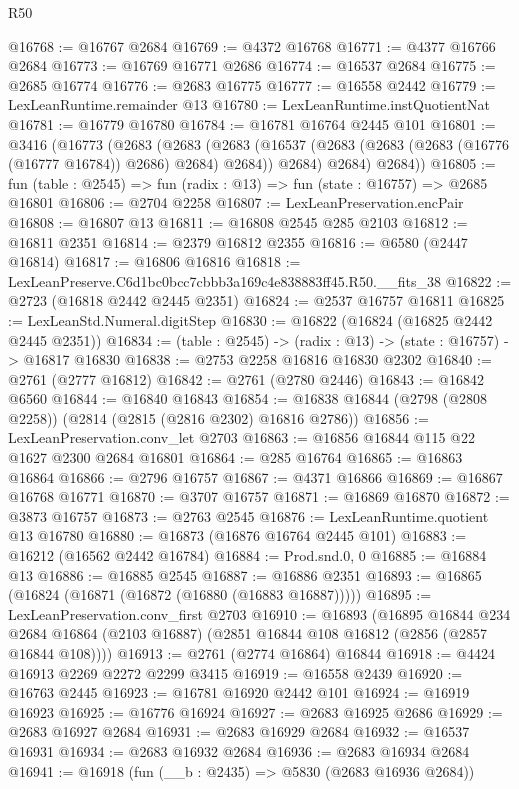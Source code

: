 \begin{lexlean}{R50}
\begin{coremodule}
@16768 := @16767 @2684
@16769 := @4372 @16768
@16771 := @4377 @16766 @2684
@16773 := @16769 @16771 @2686
@16774 := @16537 @2684
@16775 := @2685 @16774
@16776 := @2683 @16775
@16777 := @16558 @2442
@16779 := LexLeanRuntime.remainder @13
@16780 := LexLeanRuntime.instQuotientNat
@16781 := @16779 @16780
@16784 := @16781 @16764 @2445 @101
@16801 := @3416
    (@16773
      (@2683
        (@2683
          (@2683 (@16537 (@2683 (@2683 (@2683 (@16776 (@16777 @16784)) @2686) @2684) @2684)) @2684)
          @2684)
        @2684))
@16805 := fun (table : @2545) => fun (radix : @13) => fun (state : @16757) => @2685 @16801
@16806 := @2704 @2258
@16807 := LexLeanPreservation.encPair
@16808 := @16807 @13
@16811 := @16808 @2545 @285 @2103
@16812 := @16811 @2351
@16814 := @2379 @16812 @2355
@16816 := @6580 (@2447 @16814)
@16817 := @16806 @16816
@16818 := LexLeanPreserve.C6d1bc0bcc7cbbb3a169c4e838883ff45.R50.__fits_38
@16822 := @2723 (@16818 @2442 @2445 @2351)
@16824 := @2537 @16757 @16811
@16825 := LexLeanStd.Numeral.digitStep
@16830 := @16822 (@16824 (@16825 @2442 @2445 @2351))
@16834 := (table : @2545) -> (radix : @13) -> (state : @16757) -> @16817 @16830
@16838 := @2753 @2258 @16816 @16830 @2302
@16840 := @2761 (@2777 @16812)
@16842 := @2761 (@2780 @2446)
@16843 := @16842 @6560
@16844 := @16840 @16843
@16854 := @16838 @16844 (@2798 (@2808 @2258)) (@2814 (@2815 (@2816 @2302) @16816 @2786))
@16856 := LexLeanPreservation.conv_let @2703
@16863 := @16856 @16844 @115 @22 @1627 @2300 @2684 @16801
@16864 := @285 @16764
@16865 := @16863 @16864
@16866 := @2796 @16757
@16867 := @4371 @16866
@16869 := @16867 @16768 @16771
@16870 := @3707 @16757
@16871 := @16869 @16870
@16872 := @3873 @16757
@16873 := @2763 @2545
@16876 := LexLeanRuntime.quotient @13 @16780
@16880 := @16873 (@16876 @16764 @2445 @101)
@16883 := @16212 (@16562 @2442 @16784)
@16884 := Prod.snd.{0, 0}
@16885 := @16884 @13
@16886 := @16885 @2545
@16887 := @16886 @2351
@16893 := @16865 (@16824 (@16871 (@16872 (@16880 (@16883 @16887)))))
@16895 := LexLeanPreservation.conv_first @2703
@16910 := @16893
    (@16895
      @16844
      @234
      @2684
      @16864
      (@2103 @16887)
      (@2851 @16844 @108 @16812 (@2856 (@2857 @16844 @108))))
@16913 := @2761 (@2774 @16864) @16844
@16918 := @4424 @16913 @2269 @2272 @2299 @3415
@16919 := @16558 @2439
@16920 := @16763 @2445
@16923 := @16781 @16920 @2442 @101
@16924 := @16919 @16923
@16925 := @16776 @16924
@16927 := @2683 @16925 @2686
@16929 := @2683 @16927 @2684
@16931 := @2683 @16929 @2684
@16932 := @16537 @16931
@16934 := @2683 @16932 @2684
@16936 := @2683 @16934 @2684
@16941 := @16918 (fun (__b : @2435) => @5830 (@2683 @16936 @2684))

\end{coremodule}
\end{lexlean}
